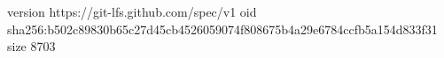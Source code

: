 version https://git-lfs.github.com/spec/v1
oid sha256:b502c89830b65c27d45cb4526059074f808675b4a29e6784ccfb5a154d833f31
size 8703
